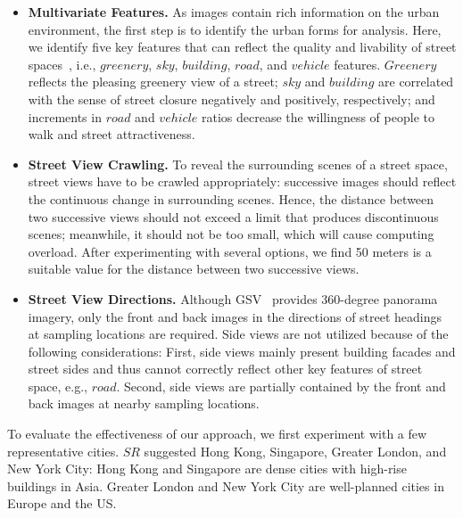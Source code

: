 \vspace*{-2mm}
\begin{itemize}

\item
\textbf{Multivariate Features.}
As images contain rich information on the urban environment, the first step is to identify the urban forms for analysis.
Here, we identify five key features that can reflect the quality and livability of street spaces~\cite{jacobs_1961_life, gehl_1971_life}, i.e., $greenery$, $sky$, $building$, $road$, and $vehicle$ features.
$Greenery$ reflects the pleasing greenery view of a street; 
$sky$ and $building$ are correlated with the sense of street closure negatively and positively, respectively; 
and increments in $road$ and $vehicle$ ratios decrease the willingness of people to walk and street attractiveness.

\vspace*{-1mm}
\item
\textbf{Street View Crawling.}
To reveal the surrounding scenes of a street space, street views have to be crawled appropriately: successive images should reflect the continuous change in surrounding scenes.
Hence, the distance between two successive views should not exceed a limit that produces discontinuous scenes; meanwhile, it should not be too small, which will cause computing overload. 
After experimenting with several options, we find 50 meters is a suitable value for the distance between two successive views.

\vspace*{-1mm}
\item
\textbf{Street View Directions.}
Although GSV~\cite{gsv_api} provides 360-degree panorama imagery, only the front and back images in the directions of street headings at sampling locations are required. 
Side views are not utilized because of the following considerations: 
First, side views mainly present building facades and street sides and thus cannot correctly reflect other key features of street space, e.g., $road$.
Second, side views are partially contained by the front and back images at nearby sampling locations. 

\end{itemize}

\vspace*{-1mm}
To evaluate the effectiveness of our approach, we first experiment with a few representative cities.
$SR$ suggested Hong Kong, Singapore, Greater London, and New York City:
Hong Kong and Singapore are dense cities with high-rise buildings in Asia.
Greater London and New York City are well-planned cities in Europe and the US.

